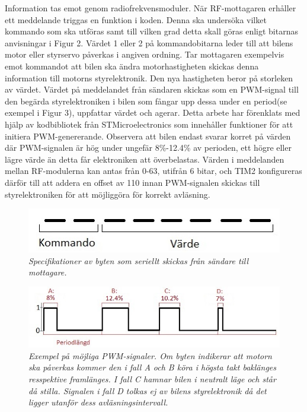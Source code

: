 \documentclass[a4paper]{article}
\begin{document}
Information tas emot genom radiofrekvensmoduler. När RF-mottagaren erhåller ett meddelande triggas en funktion i koden. Denna ska undersöka vilket kommando som ska utföras samt till vilken grad detta skall göras enligt bitarnas anvisningar i Figur 2. Värdet 1 eller 2 på kommandobitarna leder till att bilens motor eller styrservo påverkas i angiven ordning. Tar mottagaren exempelvis emot kommandot att bilen ska ändra motorhastigheten skickas denna information till motorns styrelektronik. Den nya hastigheten beror på storleken av värdet. Värdet på meddelandet från sändaren skickas som en PWM-signal till den begärda styrelektroniken i bilen som fångar upp dessa under en period(se exempel i Figur 3), uppfattar värdet och agerar. Detta arbete har förenklats med hjälp av kodbibliotek från STMicroelectronics som innehåller funktioner för att initiera PWM-genererande. Observera att bilen endast svarar korret på värden där PWM-signalen är hög under ungefär 8\%-12.4\% av perioden, ett högre eller lägre värde än detta får elektroniken att överbelastas. Värden i meddelanden mellan RF-modulerna kan antas från 0-63, utifrån 6 bitar, och TIM2 konfigureras därför till att addera en offset av 110 innan PWM-signalen skickas till styrelektroniken för att möjliggöra för korrekt avläsning.



\begin{figure}[H]
\includegraphics[scale=1]{aByteComVal.jpg}
\centering
\caption{\it Specifikationer av byten som seriellt skickas från sändare till mottagare.}
\end{figure} 


\begin{figure}[H]
\includegraphics[scale=1]{PWMsignals.jpg}
\centering
\caption{\it Exempel på möjliga PWM-signaler. Om byten indikerar att motorn ska påverkas kommer den i fall A och B köra i högsta takt baklänges resspektive framlänges. I fall C hamnar bilen i neutralt läge och står då stilla. Signalen i fall D tolkas ej av bilens styrelektronik då det ligger utanför dess avläsningsintervall.}
\end{figure} 
\end{document}
